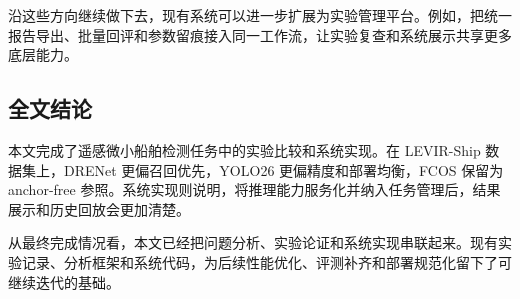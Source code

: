 沿这些方向继续做下去，现有系统可以进一步扩展为实验管理平台。例如，把统一报告导出、批量回评和参数留痕接入同一工作流，让实验复查和系统展示共享更多底层能力。

\subsection{全文结论}

本文完成了遥感微小船舶检测任务中的实验比较和系统实现。在 LEVIR-Ship 数据集上，DRENet 更偏召回优先，YOLO26 更偏精度和部署均衡，FCOS 保留为 anchor-free 参照。系统实现则说明，将推理能力服务化并纳入任务管理后，结果展示和历史回放会更加清楚。

从最终完成情况看，本文已经把问题分析、实验论证和系统实现串联起来。现有实验记录、分析框架和系统代码，为后续性能优化、评测补齐和部署规范化留下了可继续迭代的基础。
